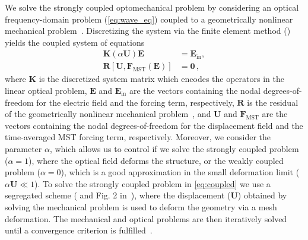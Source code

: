 We solve the strongly coupled optomechanical problem by considering an optical frequency-domain problem (\eqref{eq:wave_eq}) coupled to a geometrically nonlinear mechanical problem~\cite{ownpub5,cook_concepts_2001}. Discretizing the system via the finite element
method () yields the coupled system of equations
\begin{equation}\label{eq:coupled}
    \begin{aligned}
 \mathbf{K}\left(\alpha\mathbf{U}\right) \mathbf{E} &= \mathbf{E}_\text{in} , \\
 \mathbf{R}[\mathbf{U}, \mathbf{F}_\text{MST}(\mathbf{E})] &=\mathbf{0}\,,
    \end{aligned}
    \end{equation}
where $\mathbf{K}$ is the discretized system matrix which encodes the operators
 in the linear optical problem, $\mathbf{E}$ and 
 $\mathbf{E}_\text{in}$ are the vectors containing the nodal degrees-of-freedom for the electric 
field and the forcing term, respectively, $\mathbf{R}$ is the residual of the
 geometrically nonlinear mechanical problem~\cite{cook_concepts_2001}, and 
 $\mathbf{U}$ and $\mathbf{F}_\text{MST}$ are the vectors containing the nodal
 degrees-of-freedom for the displacement field and the time-averaged MST forcing term, respectively. 
 Moreover, we consider the parameter $\alpha$, which allows us to control if we solve 
 the strongly coupled problem ($\alpha=1$), where the optical field deforms the structure, 
 or the weakly coupled problem ($\alpha=0$), which is a good approximation in the small deformation 
 limit ($\alpha\mathbf{U} \ll 1$). To solve the strongly coupled problem in 
  \eqref{eq:coupled} we use a segregated scheme ( and Fig. 2 in~\cite{ownpub5}), where the displacement ($\mathbf{U}$) obtained
 by solving the mechanical problem is used to deform the geometry via a mesh deformation. The mechanical and
 optical problems are then iteratively solved until a convergence criterion is fulfilled~\cite {ownpub5}.

